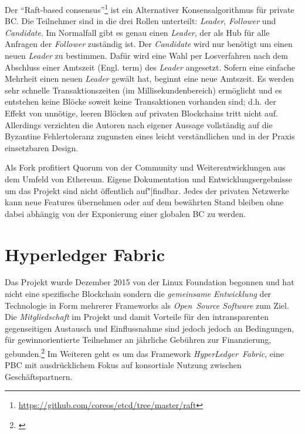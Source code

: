 
Der \enquote{Raft-based consensus}\footnote{\url{https://github.com/coreos/etcd/tree/master/raft}} ist ein Alternativer Konsensalgorithmus für private \gls{BC}. Die Teilnehmer sind in die drei Rollen unterteilt:
\emph{Leader}, \emph{Follower} und \emph{Candidate}. Im Normalfall gibt es genau einen \emph{Leader}, der als Hub für alle Anfragen der \emph{Follower} zuständig ist.
Der \emph{Candidate} wird nur benötigt um einen neuen \emph{Leader} zu bestimmen.
Dafür wird eine Wahl per Losverfahren nach dem Abschluss einer Amtszeit (Engl. term) des \emph{Leader} angesetzt.
Sofern eine einfache Mehrheit einen neuen \emph{Leader} gewält hat, beginnt eine neue Amtszeit.
Es werden sehr schnelle Transaktionszeiten (im Millisekundenbereich) ermöglicht und es entstehen keine Blöcke soweit keine Transaktionen vorhanden sind;
d.h. der Effekt von unnötige, leeren Blöcken auf privaten Blockchains tritt nicht auf.
Allerdings verzichten die Autoren nach eigener Aussage vollständig auf die Byzantine Fehlertoleranz zugunsten eines leicht verständlichen und in der Praxis einsetzbaren Design. 

Als Fork profitiert Quorum von der Community und Weiterentwicklungen aus dem Umfeld von Ethereum.
Eigene Dokumentation und Entwicklungsergebnisse um das Projekt sind nicht öffentlich auf"|findbar. 
Jedes der privaten Netzwerke kann neue Features übernehmen oder auf dem bewährten Stand bleiben
ohne dabei abhängig von der Exponierung einer globalen \gls{BC} zu werden.

\section{Hyperledger Fabric}\label{impl:hyperledger}

Das Projekt wurde Dezember 2015 von der Linux Foundation begonnen und hat nicht eine spezifische Blockchain sondern die \emph{gemeinsame Entwicklung} der Technologie in Form mehrerer Frameworks als \emph{Open~Source Software} zum Ziel.
Die \emph{Mitgliedschaft} im Projekt und damit Vorteile für den intransparenten gegenseitigen Austausch und Einflussnahme sind jedoch jedoch an Bedingungen, für gewinnorientierte Teilnehmer an jährliche Gebühren zur Finanzierung, gebunden.\footnote{\cite{w:hyperledger:membership}}
Im Weiteren geht es um das Framework \emph{HyperLedger~Fabric}, eine \gls{PBC} mit ausdrücklichem Fokus auf konsortiale Nutzung zwischen Geschäftspartnern.

